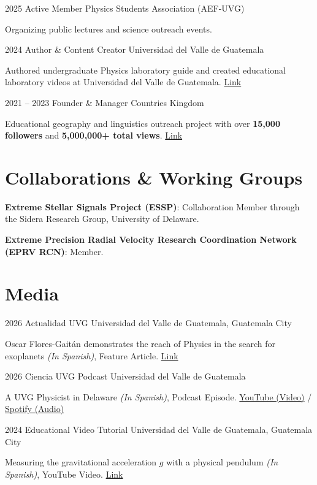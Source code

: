 \documentclass[11pt, a4paper]{article}
\begin{document}
\rubenzahlEntry
    {2025}
    {Active Member}
    {Physics Students Association (AEF-UVG)}
    {}
    {
        \item Organizing public lectures and science outreach events.
    }

\rubenzahlEntry
    {2024}
    {Author \& Content Creator}
    {Universidad del Valle de Guatemala}
    {}
    {
        \item Authored undergraduate Physics laboratory guide and created educational laboratory videos at Universidad del Valle de Guatemala. \href{https://www.youtube.com/watch?v=Q2wZin0FuK0}{Link}
    }

\rubenzahlEntry
    {2021 – 2023}
    {Founder \& Manager}
    {Countries Kingdom}
    {}
    {
        \item Educational geography and linguistics outreach project with over \textbf{15,000 followers} and \textbf{5,000,000+ total views}. \href{https://www.instagram.com/countries_kingdom/}{Link}
    }

\section{Collaborations \& Working Groups}
\begin{highlights}
    \item \textbf{\color{primaryColor} Extreme Stellar Signals Project (ESSP)}: Collaboration Member through the Sidera Research Group, University of Delaware.
    \item \textbf{\color{primaryColor} Extreme Precision Radial Velocity Research Coordination Network (EPRV RCN)}: Member.
\end{highlights}

\section{Media}

\rubenzahlEntry
    {2026}
    {Actualidad UVG}
    {Universidad del Valle de Guatemala, Guatemala City}
    {}
    {
        \item Oscar Flores-Gaitán demonstrates the reach of Physics in the search for exoplanets \textit{(In Spanish)}, Feature Article. \href{https://noticias.uvg.edu.gt/oscar-flores-gaitan-fisica-uvg-exoplanetas/}{Link}
    }

\rubenzahlEntry
    {2026}
    {Ciencia UVG Podcast}
    {Universidad del Valle de Guatemala}
    {}
    {
        \item A UVG Physicist in Delaware \textit{(In Spanish)}, Podcast Episode. \href{https://youtu.be/eA0EQ50V8YA?si=vW6mQ4eySpwrw55R}{YouTube (Video)} / \href{https://open.spotify.com/episode/3ZpnRPsEQ6Lzc4CZHmhH9e}{Spotify (Audio)}
    }

\rubenzahlEntry
    {2024}
    {Educational Video Tutorial}
    {Universidad del Valle de Guatemala, Guatemala City}
    {}
    {
        \item Measuring the gravitational acceleration $g$ with a physical pendulum \textit{(In Spanish)}, YouTube Video. \href{https://www.youtube.com/watch?v=Q2wZin0FuK0}{Link}
    }
\end{document}
